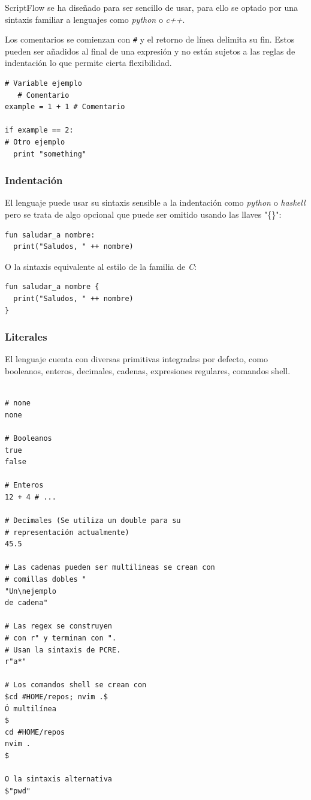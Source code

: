 \documentclass[11pt]{article}
\begin{document}
ScriptFlow se ha diseñado para ser sencillo de usar, para ello se optado por una sintaxis familiar a lenguajes como
\emph{python} o \emph{c++}.

Los comentarios se comienzan con \texttt{\#} y el retorno de línea delimita su fin. Estos pueden ser añadidos al final de una expresión y no están sujetos a las reglas de indentación
lo que permite cierta flexibilidad.

\begin{verbatim}
# Variable ejemplo
   # Comentario
example = 1 + 1 # Comentario

if example == 2:
# Otro ejemplo
  print "something"
\end{verbatim}

\subsubsection{Indentación}
\label{sec:orgd9c30e5}

\label{org21b0856}
El lenguaje puede usar su sintaxis sensible a la indentación como \emph{python} o \emph{haskell} pero se trata de algo opcional que puede ser omitido usando las llaves "\{\}":

\begin{verbatim}
fun saludar_a nombre:
  print("Saludos, " ++ nombre)
\end{verbatim}

O la sintaxis equivalente al estilo de la familia de \emph{C}:
\begin{verbatim}
fun saludar_a nombre {
  print("Saludos, " ++ nombre)
}
\end{verbatim}

\subsubsection{Literales}
\label{sec:org8193a7c}

El lenguaje cuenta con diversas primitivas integradas por defecto, como
booleanos, enteros, decimales, cadenas, expresiones regulares, comandos
shell.

\begin{verbatim}

# none
none

# Booleanos
true
false

# Enteros
12 + 4 # ...

# Decimales (Se utiliza un double para su
# representación actualmente)
45.5

# Las cadenas pueden ser multilineas se crean con
# comillas dobles "
"Un\nejemplo
de cadena"

# Las regex se construyen
# con r" y terminan con ".
# Usan la sintaxis de PCRE.
r"a*"

# Los comandos shell se crean con
$cd #HOME/repos; nvim .$
Ó multilínea
$
cd #HOME/repos
nvim .
$

O la sintaxis alternativa
$"pwd"
\end{verbatim}
\end{document}
